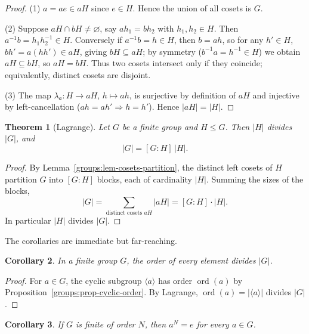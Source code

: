 \documentclass[11pt,a4paper]{article}
\newtheorem{theorem}{Theorem}[section]
\newtheorem{corollary}[theorem]{Corollary}
\theoremstyle{definition}
\theoremstyle{remark}
\DeclareMathOperator{\ord}{ord}
\begin{document}
\begin{proof}
(1) \(a = ae \in aH\) since \(e \in H\). Hence the union of all cosets is \(G\).

(2) Suppose \(aH \cap bH \neq \varnothing\), say \(ah_1 = bh_2\) with \(h_1,h_2 \in H\). Then \(a^{-1}b = h_1 h_2^{-1} \in H\). Conversely if \(a^{-1}b = h \in H\), then \(b = ah\), so for any \(h' \in H\), \(bh' = a(hh') \in aH\), giving \(bH \subseteq aH\); by symmetry (\(b^{-1}a = h^{-1} \in H\)) we obtain \(aH \subseteq bH\), so \(aH = bH\). Thus two cosets intersect only if they coincide; equivalently, distinct cosets are disjoint.

(3) The map \(\lambda_a \colon H \to aH\), \(h \mapsto ah\), is surjective by definition of \(aH\) and injective by left-cancellation (\(ah = ah' \Rightarrow h = h'\)). Hence \(|aH| = |H|\).
\end{proof}

\begin{theorem}[Lagrange]\label{groups:thm-lagrange}
Let \(G\) be a \emph{finite} group and \(H \le G\). Then \(|H|\) divides \(|G|\), and
\[
|G| = [G:H]\,|H|.
\]
\end{theorem}

\begin{proof}
By Lemma~\ref{groups:lem-cosets-partition}, the distinct left cosets of \(H\) partition \(G\) into \([G:H]\) blocks, each of cardinality \(|H|\). Summing the sizes of the blocks,
\[
|G| = \sum_{\text{distinct cosets } aH} |aH| = [G:H] \cdot |H|.
\]
In particular \(|H|\) divides \(|G|\).
\end{proof}

The corollaries are immediate but far-reaching.

\begin{corollary}\label{groups:cor-order-elt-divides}
In a finite group \(G\), the order of every element divides \(|G|\).
\end{corollary}

\begin{proof}
For \(a \in G\), the cyclic subgroup \(\langle a\rangle\) has order \(\ord(a)\) by Proposition~\ref{groups:prop-cyclic-order}. By Lagrange, \(\ord(a) = |\langle a\rangle|\) divides \(|G|\).
\end{proof}

\begin{corollary}\label{groups:cor-aG-e}
If \(G\) is finite of order \(N\), then \(a^N = e\) for every \(a \in G\).
\end{corollary}
\end{document}

